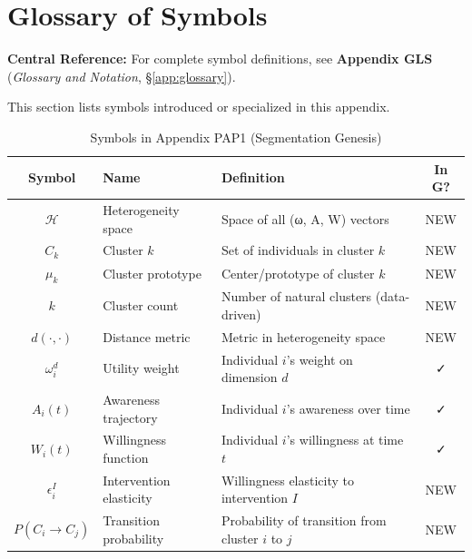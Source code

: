 \section{Glossary of Symbols}
\label{sec:ba-glossary}

\begin{tcolorbox}[colback=blue!5!white, colframe=blue!75!black]
\textbf{Central Reference:} For complete symbol definitions, see
\textbf{Appendix GLS} (\textit{Glossary and Notation}, \S\ref{app:glossary}).

This section lists symbols introduced or specialized in this appendix.
\end{tcolorbox}

\vspace{0.5em}

\begin{table}[htbp]
\centering
\caption{Symbols in Appendix PAP1 (Segmentation Genesis)}
\label{tab:ba-symbols}
\renewcommand{\arraystretch}{1.4}
\begin{tabular}{@{}clp{5cm}c@{}}
\toprule
\textbf{Symbol} & \textbf{Name} & \textbf{Definition} & \textbf{In G?} \\
\midrule
$\mathcal{H}$ & Heterogeneity space & Space of all (ω, A, W) vectors & NEW \\
$C_k$ & Cluster $k$ & Set of individuals in cluster $k$ & NEW \\
$\mu_k$ & Cluster prototype & Center/prototype of cluster $k$ & NEW \\
$k$ & Cluster count & Number of natural clusters (data-driven) & NEW \\
$d(\cdot, \cdot)$ & Distance metric & Metric in heterogeneity space & NEW \\
$\omega_i^d$ & Utility weight & Individual $i$'s weight on dimension $d$ & ✓ \\
$A_i(t)$ & Awareness trajectory & Individual $i$'s awareness over time & ✓ \\
$W_i(t)$ & Willingness function & Individual $i$'s willingness at time $t$ & ✓ \\
$\epsilon_i^I$ & Intervention elasticity & Willingness elasticity to intervention $I$ & NEW \\
$P(C_i \to C_j)$ & Transition probability & Probability of transition from cluster $i$ to $j$ & NEW \\
\bottomrule
\end{tabular}
\end{table}


